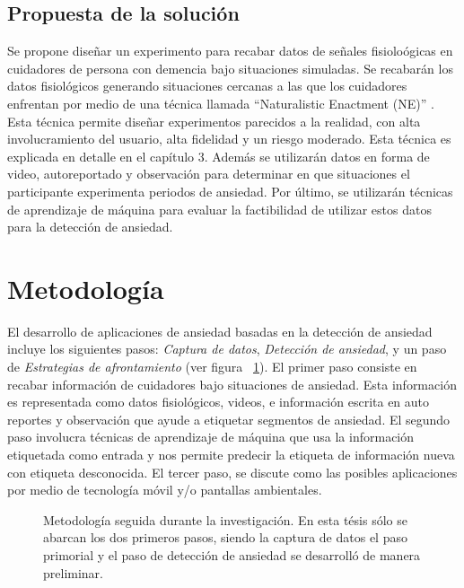 \subsection{Propuesta de la soluci\'on}
	Se propone dise\~nar un experimento para recabar datos de se\~nales fisiolo\'ogicas en cuidadores de persona con demencia bajo situaciones simuladas. Se recabar\'an los datos fisiol\'ogicos generando situaciones cercanas a las que los cuidadores enfrentan por medio de una t\'ecnica llamada ``Naturalistic Enactment (NE)'' \citep{Castro11}. Esta t\'ecnica permite dise\~nar experimentos parecidos a la realidad, con alta involucramiento del usuario, alta fidelidad y un riesgo moderado. Esta t\'ecnica es explicada en detalle en el cap\'itulo 3. Adem\'as se utilizar\'an datos en forma de video, autoreportado y observaci\'on para determinar en que situaciones el participante experimenta periodos de ansiedad. Por \'ultimo, se utilizar\'an t\'ecnicas de aprendizaje de m\'aquina para evaluar la factibilidad de utilizar estos datos para la detecci\'on de ansiedad.

\section{Metodolog\'ia }\label{secc:methodology}
El desarrollo de aplicaciones de ansiedad basadas en la detecci\'on de ansiedad incluye los siguientes pasos: \textit{Captura de datos}, \textit{Detecci\'on de ansiedad}, y un paso de \textit{Estrategias de afrontamiento} (ver figura ~\ref{fig:metodology}). El primer paso consiste en recabar informaci\'on de cuidadores bajo situaciones de ansiedad. Esta informaci\'on es representada como datos fisiol\'ogicos, videos, e informaci\'on escrita en auto reportes y observaci\'on que ayude a etiquetar segmentos de ansiedad. El segundo paso involucra t\'ecnicas de aprendizaje de m\'aquina que usa la informaci\'on etiquetada como entrada y nos permite predecir la etiqueta de informaci\'on nueva con etiqueta desconocida. El tercer paso, se discute como las posibles aplicaciones por medio de tecnolog\'ia m\'ovil y/o pantallas ambientales.
\begin{figure}[h!]
        \centering
        \caption{Metodolog\'ia seguida durante la investigaci\'on. En esta t\'esis s\'olo se abarcan los dos primeros pasos, siendo la captura de datos el paso primorial y el paso de detecci\'on de ansiedad se desarroll\'o de manera preliminar.} \label{fig:metodology}
\end{figure}
